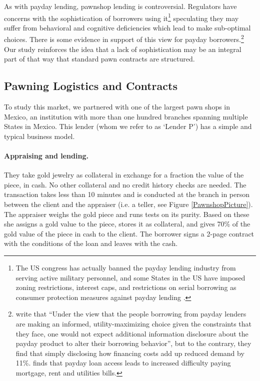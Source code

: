 \documentclass[oneside,11pt]{article}
\begin{document}


As with payday lending, pawnshop lending is controversial. Regulators have concerns with the sophistication of borrowers using it\footnote{The US congress has actually banned the payday lending industry from serving active military personnel, and some States in the US have imposed zoning restrictions, interest caps, and restrictions on serial borrowing as consumer protection measures against payday lending \citep{Payday}.} speculating they may suffer from behavioral and cognitive deficiencies which lead to make sub-optimal choices. There is some evidence in support of this view for payday borrowers.\footnote{\cite{Bertrand} write that ``Under the view that the people borrowing from payday lenders are making an informed, utility-maximizing choice given the constraints that they face, one would not expect additional information disclosure about the payday product to alter their borrowing behavior'', but to the contrary, they find that simply disclosing how financing costs add up reduced demand by 11\%. \cite{Meltzer} finds that payday loan access leads to increased difficulty paying mortgage, rent and utilities bills.}  Our study reinforces the idea that a lack of sophistication may be an integral part of that way that standard pawn contracts are structured.



\subsection{Pawning Logistics and Contracts}

To study this market, we partnered with one of the largest pawn shops in Mexico, an institution with more than one hundred branches spanning multiple States in Mexico. This lender (whom we refer to as `Lender P') has a simple and typical business model. 

\paragraph{Appraising and lending.} They take gold jewelry as collateral in exchange for a fraction the value of the piece, in cash. No other collateral and no credit history checks are needed. The transaction takes less than 10 minutes and is conducted at the branch in person between the client and the appraiser (i.e. a teller, see Figure \ref{PawnshopPicture}). The appraiser weighs the gold piece and runs tests on its purity. Based on these she assigns a gold value to the piece, stores it as collateral, and gives 70\% of the gold value of the piece in cash to the client. The borrower signs a 2-page contract with the conditions of the loan and leaves with the cash.
\end{document}
